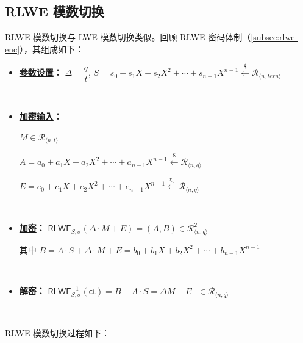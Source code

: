 \subsection{RLWE 模数切换}
\label{subsec:modulus-switch-rlwe}




RLWE 模数切换与 LWE 模数切换类似。回顾 RLWE 密码体制（\autoref{subsec:rlwe-enc}），其组成如下：

\begin{itemize}
\item \textbf{\underline{参数设置}：}
$\Delta = \dfrac{q}{t}$, \text{ } $S = s_0 + s_1X + s_2X^2 + \cdots + s_{n-1}X^{n-1} \xleftarrow{\$} \mathcal{R}_{\langle n, \textit{tern} \rangle}$

$ $

\item \textbf{\underline{加密输入}：}

$M \in \mathcal{R}_{\langle n, t \rangle}$

$A = a_0 + a_1X + a_2X^2 + \cdots + a_{n-1}X^{n-1} \xleftarrow{\$} \mathcal{R}_{\langle n, q \rangle}$

$E = e_0 + e_1X + e_2X^2 + \cdots + e_{n-1}X^{n-1} \xleftarrow{\chi_\sigma} \mathcal{R}_{\langle n, q \rangle}$ 

$ $

\item \textbf{\underline{加密}：}
$\textsf{RLWE}_{S,\sigma}(\Delta \cdot M + E) = (A, B) \in \mathcal{R}_{\langle n,q \rangle}^2$ 

其中 $B = A \cdot S + \Delta \cdot M + E = b_0 + b_1X + b_2X^2 + \cdots + b_{n-1}X^{n-1}$

$ $

\item \textbf{\underline{解密}：} $\textsf{RLWE}^{-1}_{S,\sigma}(\textsf{ct}) = B - A \cdot S = \Delta  M + E \text{ } \in \mathcal{R}_{\langle n,q \rangle}$
\end{itemize}

$ $

RLWE 模数切换过程如下：

